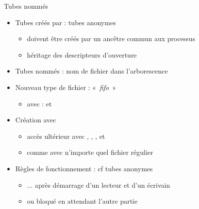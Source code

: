 

\begin {frame} {Tubes nommés}

    \begin {itemize}
	\item Tubes créés par  : tubes anonymes
	    \begin {itemize}
		\item doivent être créés par un ancêtre commun aux
		    processus
		\item héritage des descripteurs d'ouverture
	    \end {itemize}
	\item Tubes nommés : nom de fichier dans l'arborescence
	\item Nouveau type de fichier : «~\textit {fifo}~»
	    \begin {itemize}
		\item avec  :  et
	    \end {itemize}
	\item Création avec 
	    \begin {itemize}
		\item accès ultérieur avec , ,
		    , et 
		\item \implique comme avec n'importe quel fichier régulier
	    \end {itemize}
	\item Règles de fonctionnement : cf tubes anonymes
	    \begin {itemize}
		\item ... après démarrage d'un lecteur et d'un écrivain
		\item {} ou  bloqué en attendant
		    l'autre partie
	    \end {itemize}
    \end {itemize}
\end {frame}



